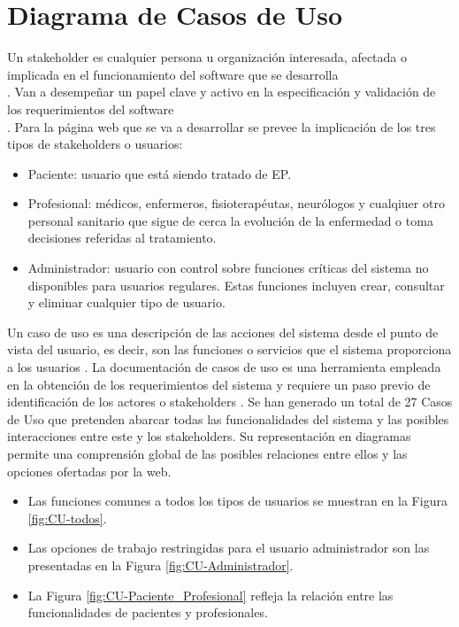\section{Diagrama de Casos de Uso}
Un stakeholder es cualquier persona u organización interesada, afectada o implicada en el funcionamiento del software que se desarrolla \\ \cite{pradel2013ingenieria}. Van a desempeñar un papel clave y activo en la especificación y validación de los requerimientos del software \\ \cite{oliveros2014stakeholders}. Para la página web que se va a desarrollar se prevee la implicación de los tres tipos de stakeholders o usuarios:
\begin{itemize}
    \item Paciente: usuario que está siendo tratado de EP.
    \item Profesional: médicos, enfermeros, fisioterapéutas, neurólogos y cualqiuer otro personal sanitario que sigue de cerca la evolución de la enfermedad o toma decisiones referidas al tratamiento.
    \item Administrador: usuario con control sobre funciones críticas del sistema no disponibles para usuarios regulares. Estas funciones incluyen crear, consultar y eliminar cualquier tipo de usuario.
\end{itemize}

Un caso de uso es una descripción de las acciones del sistema desde el punto de vista del usuario, es decir, son las funciones o servicios que el sistema proporciona a los usuarios \cite{Microsof53:online}. La documentación de casos de uso es una herramienta empleada en la obtención de los requerimientos del sistema y requiere un paso previo de identificación de los actores o stakeholders \cite{UMLCasos85:online}.
Se han generado un total de 27 Casos de Uso que pretenden abarcar todas las funcionalidades del sistema y las posibles interacciones entre este y los stakeholders. Su representación en diagramas permite una comprensión global de las posibles relaciones entre ellos y las opciones ofertadas por la web.
\begin{itemize}
    \item Las funciones comunes a todos los tipos de usuarios se muestran en la Figura \ref{fig:CU-todos}.
    \item Las opciones de trabajo restringidas para el usuario administrador son las presentadas en la Figura \ref{fig:CU-Administrador}.
    \item La Figura \ref{fig:CU-Paciente_Profesional} refleja la relación entre las funcionalidades de pacientes y profesionales.
\end{itemize}

